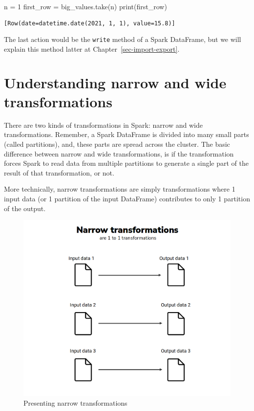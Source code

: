 \documentclass[
  11pt,
  letterpaper,
  DIV=11,
  numbers=noendperiod]{scrreprt}
\newenvironment{Shaded}{\begin{snugshade}}{\end{snugshade}}
\newcommand{\BuiltInTok}[1]{\textcolor[rgb]{0.00,0.23,0.31}{#1}}
\newcommand{\DecValTok}[1]{\textcolor[rgb]{0.68,0.00,0.00}{#1}}
\newcommand{\NormalTok}[1]{\textcolor[rgb]{0.00,0.23,0.31}{#1}}
\newcommand{\OperatorTok}[1]{\textcolor[rgb]{0.37,0.37,0.37}{#1}}
\begin{document}
\begin{Shaded}
\begin{Highlighting}[]
\NormalTok{n }\OperatorTok{=} \DecValTok{1}
\NormalTok{first\_row }\OperatorTok{=}\NormalTok{ big\_values.take(n)}
\BuiltInTok{print}\NormalTok{(first\_row)}
\end{Highlighting}
\end{Shaded}

\begin{verbatim}
[Row(date=datetime.date(2021, 1, 1), value=15.8)]
\end{verbatim}

The last action would be the \texttt{write} method of a Spark DataFrame,
but we will explain this method latter at
Chapter~\ref{sec-import-export}.

\hypertarget{understanding-narrow-and-wide-transformations}{%
\section{Understanding narrow and wide
transformations}\label{understanding-narrow-and-wide-transformations}}

There are two kinds of transformations in Spark: narrow and wide
transformations. Remember, a Spark DataFrame is divided into many small
parts (called partitions), and, these parts are spread across the
cluster. The basic difference between narrow and wide transformations,
is if the transformation forces Spark to read data from multiple
partitions to generate a single part of the result of that
transformation, or not.

More technically, narrow transformations are simply transformations
where 1 input data (or 1 partition of the input DataFrame) contributes
to only 1 partition of the output.

\begin{figure}

{\centering \includegraphics{Chapters/../Figures/narrow-transformations.png}

}

\caption{\label{fig-narrow-transformations}Presenting narrow
transformations}

\end{figure}
\end{document}
